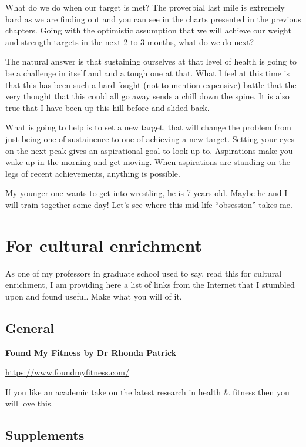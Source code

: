 \documentclass[
  oneside]{book}
\begin{document}
What do we do when our target is met? The proverbial last mile is extremely hard as we are finding out and you can see in the charts presented in the previous chapters. Going with the optimistic assumption that we will achieve our weight and strength targets in the next 2 to 3 months, what do we do next?

The natural answer is that sustaining ourselves at that level of health is going to be a challenge in itself and and a tough one at that. What I feel at this time is that this has been such a hard fought (not to mention expensive) battle that the very thought that this could all go away sends a chill down the spine. It is also true that I have been up this hill before and slided back.

What is going to help is to set a new target, that will change the problem from just being one of sustainence to one of achieving a new target. Setting your eyes on the next peak gives an aspirational goal to look up to. Aspirations make you wake up in the morning and get moving. When aspirations are standing on the legs of recent achievements, anything is possible.

My younger one wants to get into wrestling, he is 7 years old. Maybe he and I will train together some day! Let's see where this mid life ``obsession'' takes me.

\hypertarget{for-cultural-enrichment}{%
\chapter{For cultural enrichment}\label{for-cultural-enrichment}}

As one of my professors in graduate school used to say, read this for cultural enrichment, I am providing here a list of links from the Internet that I stumbled upon and found useful. Make what you will of it.

\hypertarget{general}{%
\section{General}\label{general}}

\textbf{Found My Fitness by Dr Rhonda Patrick}

\url{https://www.foundmyfitness.com/}

If you like an academic take on the latest research in health \& fitness then you will love this.

\hypertarget{supplements}{%
\section{Supplements}\label{supplements}}
\end{document}
